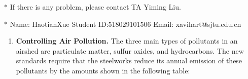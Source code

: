 \documentclass[12pt,a4paper]{article}
\theoremstyle{definition}
\begin{document}
\noindent

\noindent{}
\begin{center}
\footnotesize{\color{red}$*$ If there is any problem, please contact TA Yiming Liu. }

\footnotesize{\color{blue}$*$ Name: HaotianXue  \quad Student ID:518029101506 \quad Email: xavihart@sjtu.edu.cn}
\end{center}
\begin{enumerate}

   \item 
   \textbf{Controlling Air Pollution. }The three main types of pollutants in an airshed are particulate matter, sulfur oxides, and hydrocarbons. The new standards require that the steelworks reduce its annual emission of these pollutants by the amounts shown in the following table: 
	\begin{table}[h]
		\footnotesize
		\centering
	    \label{standards}
	    \renewcommand\arraystretch{1.1}
		\begin{tabular}{lc}
			

\end{tabular}
\end{table}
\end{enumerate}
\end{document}
